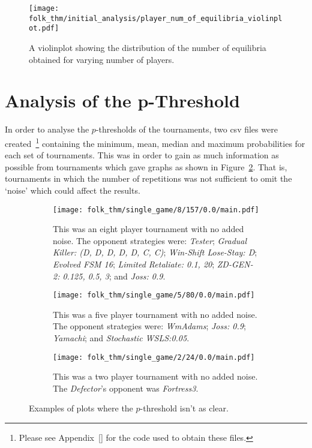 \begin{figure}      
    \centering
    \texttt{[image: folk\_thm/initial\_analysis/player\_num\_of\_equilibria\_violinplot.pdf]}
    \caption{A violinplot showing the distribution of the number of equilibria obtained for varying number of players.}\label{fig:NE_violinplot}
\end{figure}



\section{Analysis of the p-Threshold}\label{sec:Analysis_of_the_p-Threshold}
In order to analyse the \(p\)-thresholds of the tournaments, two csv files were
created~\footnote{Please see Appendix~\ref{} %
for the code used to obtain these files.} containing the
minimum, mean, median and maximum probabilities for each set of tournaments.
This was in order to gain as much information as possible from tournaments which
gave graphs as shown in Figure~\ref{fig:less_clear}. That is, tournaments in
which the number of repetitions was not sufficient to omit the `noise' which
could affect the results.

\begin{figure}
    \begin{subfigure}{.3\textwidth}
        \centering
        \texttt{[image: folk\_thm/single\_game/8/157/0.0/main.pdf]}
        \caption{This was an eight player tournament with no added noise. The opponent strategies were: \textit{Tester}; \textit{Gradual Killer: (D, D, D, D, D, C, C)}; \textit{Win-Shift Lose-Stay: D}; \textit{Evolved FSM 16}; \textit{Limited Retaliate: 0.1, 20}; \textit{ZD-GEN-2: 0.125, 0.5, 3}; and \textit{Joss: 0.9}.}
    \end{subfigure}
    \begin{subfigure}{.3\textwidth}
        \centering
        \texttt{[image: folk\_thm/single\_game/5/80/0.0/main.pdf]}
        \caption{This was a five player tournament with no added noise. The opponent strategies were: \textit{WmAdams}; \textit{Joss: 0.9}; \textit{Yamachi}; and \textit{Stochastic WSLS:\@ 0.05}.}
    \end{subfigure}
    \begin{subfigure}{.3\textwidth}
        \centering
        \texttt{[image: folk\_thm/single\_game/2/24/0.0/main.pdf]}
        \caption{This was a two player tournament with no added noise. The \textit{Defector}'s opponent was \textit{Fortress3}.}
    \end{subfigure}
    \caption{Examples of plots where the \(p\)-threshold isn't as clear.}\label{fig:less_clear}
\end{figure}

